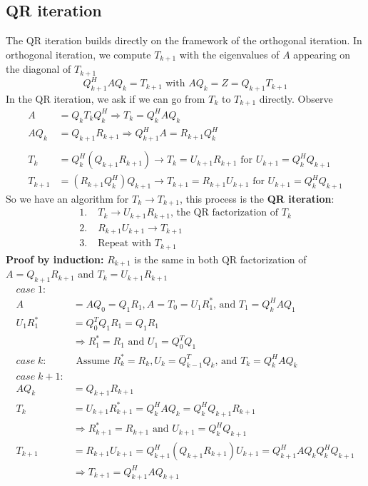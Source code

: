 \documentclass{article}
\begin{document}
\subsection{QR iteration}
The QR iteration builds directly on the framework of the orthogonal iteration. In orthogonal iteration, we compute $T_{k+1}$ with the eigenvalues of $A$ appearing on the diagonal of $T_{k+1}$
\begin{equation*}
    Q_{k+1}^HAQ_k = T_{k+1} \textrm{ with }AQ_k = Z = Q_{k+1}T_{k+1}
\end{equation*} 
In the QR iteration, we ask if we can go from $T_k$ to $T_{k+1}$ directly. Observe
\begin{align*}
    A &= Q_k T_k Q_k^H \Longrightarrow T_k = Q_k^HAQ_k\\
    AQ_k &= Q_{k+1}R_{k+1} \Longrightarrow Q_{k+1}^HA = R_{k+1}Q_k^H\\ \\
    T_k &= Q_k^H(Q_{k+1}R_{k+1}) \longrightarrow T_k = U_{k+1} R_{k+1} \textrm{ for } U_{k+1} = Q_k^HQ_{k+1}\\
    T_{k+1} &= (R_{k+1}Q_k^H)Q_{k+1} \longrightarrow T_{k+1} = R_{k+1}U_{k+1} \textrm{ for } U_{k+1} = Q_k^HQ_{k+1}
\end{align*} 
So we have an algorithm for $T_k \rightarrow T_{k+1}$, this process is the \textbf{QR iteration}:
\begin{align*}
    1. \;& T_k \longrightarrow U_{k+1}R_{k+1} \textrm{, the QR factorization of } T_k\\
    2. \;&R_{k+1}U_{k+1} \longrightarrow T_{k+1}\\
    3. \;&\textrm{Repeat with } T_{k+1}
\end{align*}
\textbf{Proof by induction:} $R_{k+1}$ is the same in both QR factorization of $A = Q_{k+1}R_{k+1}$ and $T_k = U_{k+1}R_{k+1}$
\begin{align*}
    case \; 1:&\\
    A &= AQ_0 = Q_1R_1, A = T_0 =U_1R_1^* \textrm{, and } T_1 = Q_k^HAQ_1\\
    U_1R_1^* &= Q_0^TQ_1R_1 = Q_1R_1\\
    &\Rightarrow R_1^* = R_1 \textrm{ and } U_1 = Q_0^TQ_1\\
    case \; k:& \textrm{ Assume } R_k^* = R_k, U_k = Q_{k-1}^TQ_k \textrm{, and } T_k = Q_k^HAQ_k\\
    case \; k+1:&\\
    AQ_k &= Q_{k+1}R_{k+1}\\
    T_k &=U_{k+1}R_{k+1}^* = Q_k^HAQ_k = Q_k^HQ_{k+1}R_{k+1}\\
    &\Rightarrow R_{k+1}^* = R_{k+1} \text{ and } U_{k+1} = Q_k^HQ_{k+1}\\
    T_{k+1} &= R_{k+1}U_{k+1} = Q_{k+1}^H(Q_{k+1}R_{k+1})U_{k+1} = Q_{k+1}^HAQ_kQ_k^HQ_{k+1}\\
    &\Rightarrow T_{k+1} = Q_{k+1}^HAQ_{k+1}
\end{align*}
\end{document}
